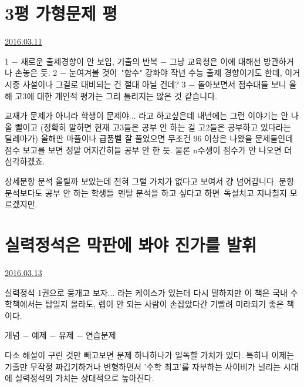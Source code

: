 \section{3평 가형문제 평}
\href{https://www.kockoc.com/Apoc/673299}{2016.03.11}

\vspace{5mm}

1 $-$ 새로운 출제경향이 안 보임, 기출의 반복 $-$ 그냥 교육청은 이에 대해선 방관하거나 손놓은 듯.
2 $-$ 눈여겨볼 것이 "함수" 강화야 작년 수능 출제 경향이기도 한데, 이거 시중 사설이나 그걸로 대비되는 건 절대 아닐 건데?
3 $-$ 돌아보면서 점수대들 보니 올해 고3에 대한 개인적 평가는 그리 틀리지는 않은 것 같습니다.
\vspace{5mm}

교재가 문제가 아니라 학생이 문제야... 라고 하고싶은데 내년에는 그런 이야기는 안 나올 삘이고
(정확히 말하면 현재 고3들은 공부 안 하는 걸 고2들은 공부하고 있다라는 딜레마가)
올해판 마플이나 급품벨 잘 풀었으면 무조건 96 이상은 나왔을 문제들인데 점수 보고를 보면 정말 어지간히들 공부 안 한 듯.
물론 n수생이 점수가 안 나오면 더 심각하겠죠.
\vspace{5mm}

상세문항 분석 올릴까 보았는데 전혀 그럴 가치가 없다고 보여서 걍 넘어갑니다.
문항분석보다도 공부 안 하는 학생들 멘탈 분석을 하고 싶다고 하면 독설치고 지나칠지 모르겠지만.
\vspace{5mm}









\section{실력정석은 막판에 봐야 진가를 발휘}
\href{https://www.kockoc.com/Apoc/675627}{2016.03.13}

\vspace{5mm}

실력정석 1권으로 뭉개고 보자... 라는 케이스가 있는데
다시 말하지만 이 책은 국내 수학책에서는 탑일지 몰라도, 렙이 안 되는 사람이 손잡았다간 기빨려 미라되기 좋은 책이다.
\vspace{5mm}

개념 $-$ 예제 $-$ 유제 $-$ 연습문제
\vspace{5mm}

다소 해설이 구린 것만 빼고보면 문제 하나하나가 일독할 가치가 있다.
특히나 이제는 기출만 무작정 짜깁기하거나 변형하면서 '수학 최고'를 자부하는 사이비가 널리는 시대에 실력정석의 가치는 상대적으로 높아진다.
\vspace{5mm}

